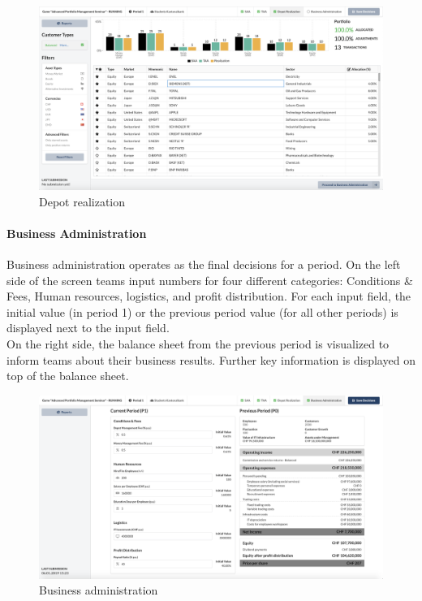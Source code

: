 \begin{figure}[h!]
  \centering
  \includegraphics[scale=0.2]{img/application-overview/teams/05_depot_realization.png}
  \caption{Depot realization}
\end{figure}

\paragraph{Business Administration}
Business administration operates as the final decisions for a period. On the left side of the screen teams input numbers for four different categories: Conditions \& Fees, Human resources, logistics, and profit distribution. For each input field, the initial value (in period 1) or the previous period value (for all other periods) is displayed next to the input field.\\

On the right side, the balance sheet from the previous period is visualized to inform teams about their business results. Further key information is displayed on top of the balance sheet.
\begin{figure}[h!]
  \centering
  \includegraphics[scale=0.2]{img/application-overview/teams/06_business.png}
  \caption{Business administration}
\end{figure}

